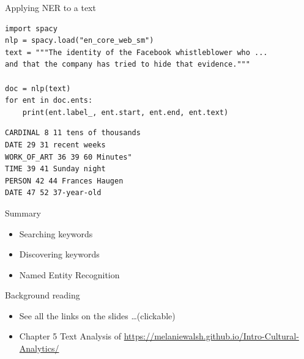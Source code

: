 \documentclass[aspectratio=169,usenames,dvipsnames]{beamer}
\begin{document}
\begin{frame}[fragile]{Applying NER to a text}
\begin{lstlisting}
import spacy
nlp = spacy.load("en_core_web_sm")
text = """The identity of the Facebook whistleblower who ...
and that the company has tried to hide that evidence."""

doc = nlp(text)
for ent in doc.ents:
    print(ent.label_, ent.start, ent.end, ent.text)
\end{lstlisting}
\begin{verbatim}
CARDINAL 8 11 tens of thousands
DATE 29 31 recent weeks
WORK_OF_ART 36 39 60 Minutes"
TIME 39 41 Sunday night
PERSON 42 44 Frances Haugen
DATE 47 52 37-year-old
\end{verbatim}
\end{frame}

\begin{frame}{Summary}
    \begin{itemize}
        \item Searching keywords
        \item Discovering keywords
        \item Named Entity Recognition
    \end{itemize}
\end{frame}


\begin{frame}{Background reading}
    \begin{itemize}
        \item See all the links on the slides \dots (clickable)
        \item Chapter 5 Text Analysis of \url{https://melaniewalsh.github.io/Intro-Cultural-Analytics/}
    \end{itemize}
\end{frame}
\end{document}
